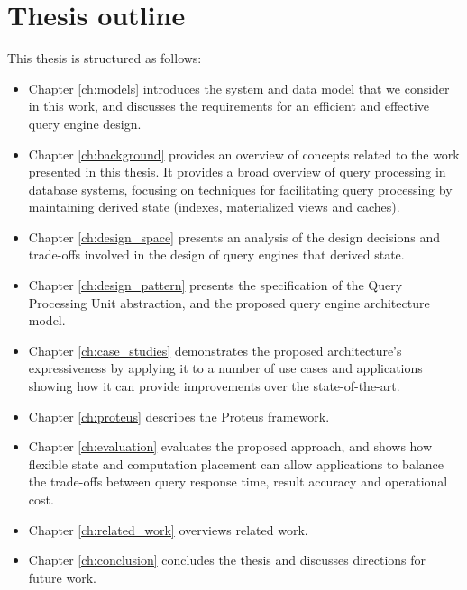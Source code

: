 \section{Thesis outline}

This thesis is structured as follows:

\begin{itemize}

  \item Chapter \ref{ch:models} introduces the system and data model that we consider in this work,
  and discusses the requirements for an efficient and effective query engine design.

  \item Chapter \ref{ch:background} provides an overview of concepts related to the work presented in this thesis.
  It provides a broad overview of query processing in database systems,
  focusing on techniques for facilitating query processing by maintaining derived state (indexes, materialized views and caches).

  \item Chapter \ref{ch:design_space} presents an analysis of the design decisions and trade-offs involved in the design
  of query engines that derived state.

  \item Chapter \ref{ch:design_pattern} presents the specification of the Query Processing Unit abstraction,
  and the proposed query engine architecture model.

  \item Chapter \ref{ch:case_studies} demonstrates the proposed architecture's expressiveness by applying it to a number
  of use cases and applications showing how it can provide improvements over the state-of-the-art.

  \item Chapter \ref{ch:proteus} describes the Proteus framework.

  \item Chapter \ref{ch:evaluation} evaluates the proposed approach,
  and shows how flexible state and computation placement can allow applications to balance the trade-offs between
  query response time, result accuracy and operational cost.

  \item Chapter \ref{ch:related_work} overviews related work.

  \item Chapter \ref{ch:conclusion} concludes the thesis and discusses directions for future work.
\end{itemize}

